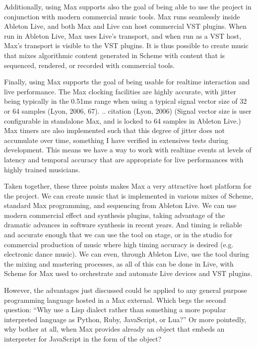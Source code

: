 \documentclass[letterpaper,10pt,english]{sphinxmanual}
\begin{document}
\sphinxAtStartPar
Additionally, using Max supports also the goal of being able to use the project in conjunction with modern commercial music tools.
Max runs seamlessly inside Ableton Live, and both Max and Live can host commercial VST plugins.
When run in Ableton Live, Max uses Live’s transport, and when run as a VST host, Max’s transport is visible to the VST plugins.
It is thus possible to create music that mixes algorithmic content generated in Scheme with
content that is sequenced, rendered, or recorded with commercial tools.

\sphinxAtStartPar
Finally, using Max supports the goal of being usable for real\sphinxhyphen{}time interaction and live performance.
The Max clocking facilities are highly accurate, with jitter being typically in the 0.5\sphinxhyphen{}1ms range when
using a typical signal vector size of 32 or 64 samples (Lyon, 2006, 67).
.. citation (Lyon, 2006)
(Signal vector size is user configurable in standalone Max, and is locked to 64 samples in Ableton Live.)
Max timers are also implemented such that this degree of jitter does not accumulate over time, something
I have verified in extensives tests during development.
This means we have a way to work with realtime events at levels of latency and temporal accuracy that
are appropriate for live performances with highly trained musicians.

\sphinxAtStartPar
Taken together, these three points makes Max a very attractive host platform for the project.
We can create music that is implemented in various mixes of Scheme, standard Max programming, and sequencing from Ableton Live.
We can use modern commercial effect and synthesis plugins, taking advantage of the dramatic advances in software synthesis in recent years.
And timing is reliable and accurate enough that we can use the tool on stage, or in the studio for commercial production of
music where high timing accuracy is desired (e.g. electronic dance music).
We can even, through Ableton Live, use the tool during the mixing and mastering processes, as all of this can be done in Live,
with Scheme for Max used to orchestrate and automate Live devices and VST plugins.

\sphinxAtStartPar
However, the advantages just discussed could be applied to any general purpose programming
language hosted in a Max external.
Which begs the second question: “Why use a Lisp dialect rather than something a more popular interpreted language as Python, Ruby,
JavaScript, or Lua?”
Or more pointedly, why bother at all, when Max provides already an object that embeds an interpreter for JavaScript in the form of
the  object?
\end{document}
